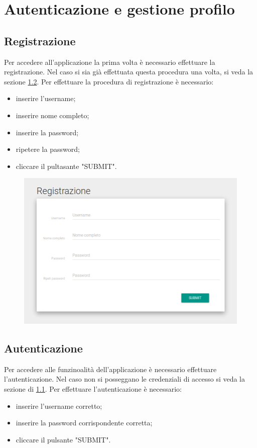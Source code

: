 \documentclass[12pt,a4paper]{article}
\begin{document}
	\section{Autenticazione e gestione profilo}
	\subsection{Registrazione}\label{registrazione}
	Per accedere all'applicazione la prima volta è necessario effettuare la registrazione. Nel caso si sia già effettuata questa procedura una volta, si veda la sezione \ref{autenticazione}.
	Per effettuare la procedura di registrazione è necessario:
	\begin{itemize}
		\item inserire l'username;
		\item inserire nome completo;
		\item inserire la password;
		\item ripetere la password;
		\item cliccare il pultasante "SUBMIT". 
	\end{itemize}

\begin{figure}[h]
		
\centering
\includegraphics[width=0.8\linewidth]{../img/screenshot/signup.png}
\caption{}
\label{Schermata di registrazione}
\end{figure}


	\subsection{Autenticazione}\label{autenticazione}
	Per accedere alle funzinoalità dell'applicazione è necessario effettuare l'autenticazione. Nel caso non si posseggano le credenziali di accesso si veda la sezione di \ref{registrazione}.
	Per effettuare l'autenticazione è necessario:
		\begin{itemize}
			\item inserire l'username corretto;
			\item inserire la password corrispondente corretta;
			\item cliccare il pulsante "SUBMIT".
		\end{itemize}
	
\end{document}
